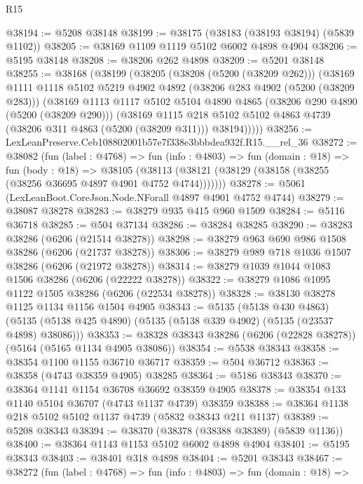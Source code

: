 \begin{lexlean}{R15}
\begin{coremodule}
{{{{{{{{{{{@38194 := @5208 @38148
@38199 := @38175 (@38183 (@38193 @38194) (@5839 @1102))
@38205 := @38169 @1109 @1119 @5102 @6002 @4898 @4904
@38206 := @5195 @38148
@38208 := @38206 @262 @4898
@38209 := @5201 @38148
@38255 := @38168
    (@38199
      (@38205
        (@38208 (@5200 (@38209 @262)))
        (@38169
          @1111
          @1118
          @5102
          @5219
          @4902
          @4892
          (@38206 @283 @4902 (@5200 (@38209 @283)))
          (@38169
            @1113
            @1117
            @5102
            @5104
            @4890
            @4865
            (@38206 @290 @4890 (@5200 (@38209 @290)))
            (@38169
              @1115
              @218
              @5102
              @5102
              @4863
              @4739
              (@38206 @311 @4863 (@5200 (@38209 @311)))
              @38194)))))
@38256 := LexLeanPreserve.Ceb108802001b57e7f338e3bbbdea932f.R15.__rel_36
@38272 := @38082
    (fun (label : @4768) =>
    fun (info : @4803) =>
    fun (domain : @18) =>
    fun (body : @18) =>
    @38105 (@38113 (@38121 (@38129 (@38158 (@38255 (@38256 @36695 @4897 @4901 @4752 @4744)))))))
@38278 := @5061 (LexLeanBoot.CoreJson.Node.NForall @4897 @4901 @4752 @4744)
@38279 := @38087 @38278
@38283 := @38279 @935 @415 @960 @1509
@38284 := @5116 @36718
@38285 := @504 @37134
@38286 := @38284 @38285
@38290 := @38283 @38286 (@6206 (@21514 @38278))
@38298 := @38279 @963 @690 @986 @1508 @38286 (@6206 (@21737 @38278))
@38306 := @38279 @989 @718 @1036 @1507 @38286 (@6206 (@21972 @38278))
@38314 := @38279 @1039 @1044 @1083 @1506 @38286 (@6206 (@22222 @38278))
@38322 := @38279 @1086 @1095 @1122 @1505 @38286 (@6206 (@22534 @38278))
@38328 := @38130 @38278 @1125 @1134 @1156 @1504 @4905
@38343 := @5135
    (@5138 @430 @4863)
    (@5135 (@5138 @425 @4890) (@5135 (@5138 @339 @4902) (@5135 (@23537 @4898) @38086)))
@38353 := @38328 @38343 @38286 (@6206 (@22828 @38278)) (@5164 (@5165 @1134 @4905 @38086))
@38354 := @5538 @38343
@38358 := @38354 @1100 @1155 @36710 @36717
@38359 := @504 @36712
@38363 := @38358 (@4743 @38359 @4905) @38285
@38364 := @5186 @38343
@38370 := @38364 @1141 @1154 @36708 @36692 @38359 @4905
@38378 := @38354 @133 @1140 @5104 @36707 (@4743 @1137 @4739) @38359
@38388 := @38364 @1138 @218 @5102 @5102 @1137 @4739 (@5832 @38343 @211 @1137)
@38389 := @5208 @38343
@38394 := @38370 (@38378 (@38388 @38389) (@5839 @1136))
@38400 := @38364 @1143 @1153 @5102 @6002 @4898 @4904
@38401 := @5195 @38343
@38403 := @38401 @318 @4898
@38404 := @5201 @38343
@38467 := @38272
    (fun (label : @4768) =>
    fun (info : @4803) =>
    fun (domain : @18) =>
}}}}}}}}}}}
\end{coremodule}
\end{lexlean}
